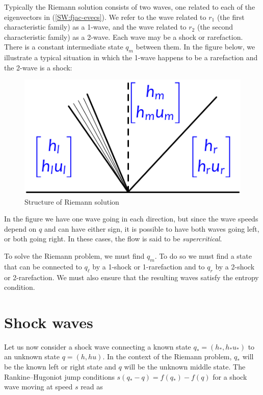 \documentclass{SIAMbook2016}
\makeatletter
\def\maxwidth{\ifdim\Gin@nat@width>\linewidth\linewidth
    \else\Gin@nat@width\fi}
\let\Oldincludegraphics\includegraphics
\renewcommand{\includegraphics}[1]{\Oldincludegraphics[width=.8\maxwidth]{#1}}
\makeatother
\begin{document}
Typically the Riemann solution consists of two waves, one related to
each of the eigenvectors in (\ref{SW:fjac-evecs}). We refer to the wave
related to \(r_1\) (the first characteristic family) as a 1-wave, and
the wave related to \(r_2\) (the second characteristic family) as a
2-wave. Each wave may be a shock or rarefaction. There is a constant
intermediate state \(q_m\) between them. In the figure below, we
illustrate a typical situation in which the 1-wave happens to be a
rarefaction and the 2-wave is a shock:

\begin{figure}
\centering
\includegraphics{./figures/shallow_water_riemann.png}
\caption{Structure of Riemann solution}
\end{figure}

In the figure we have one wave going in each direction, but since the
wave speeds depend on \(q\) and can have either sign, it is possible to
have both waves going left, or both going right. In these cases, the
flow is said to be \emph{supercritical}.

To solve the Riemann problem, we must find \(q_m\). To do so we must
find a state that can be connected to \(q_\ell\) by a 1-shock or
1-rarefaction and to \(q_r\) by a 2-shock or 2-rarefaction. We must also
ensure that the resulting waves satisfy the entropy condition.

\hypertarget{shock-waves}{%
\section{Shock waves}\label{shock-waves}}

Let us now consider a shock wave connecting a known state
\(q_*=(h_*, h_* u_*)\) to an unknown state \(q=(h,hu)\). In the context
of the Riemann problem, \(q_*\) will be the known left or right state
and \(q\) will be the unknown middle state. The Rankine--Hugoniot jump
conditions \(s(q_* - q) = f(q_*) - f(q)\) for a shock wave moving at
speed \(s\) read as
\end{document}
